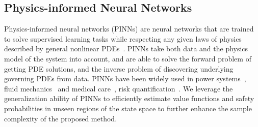 \documentclass[letterpaper]{article} %
\newcommand{\eg}{\textit{e.g., }}
\begin{document}


\subsection{Physics-informed Neural Networks}
Physics-informed neural networks (PINNs) are neural networks that are trained to solve supervised learning tasks while respecting any given laws of physics described by general nonlinear PDEs~\citep{raissi2019physics}. PINNs take both data and the physics model of the system into account, and are able to solve the forward problem of getting PDE solutions, and the inverse problem of discovering underlying governing PDEs from data. PINNs have been widely used in power systems~\cite{misyris2020physics}, fluid mechanics~\cite{cai2022physics} and medical care~\cite{sahli2020physics}, risk quantification~\cite{han2018solving, pereira2021safe, wang2023generalizable}. We leverage the generalization ability of PINNs to efficiently estimate value functions and safety probabilities in unseen regions of the state space to further enhance the sample complexity of the proposed method. 
\end{document}

